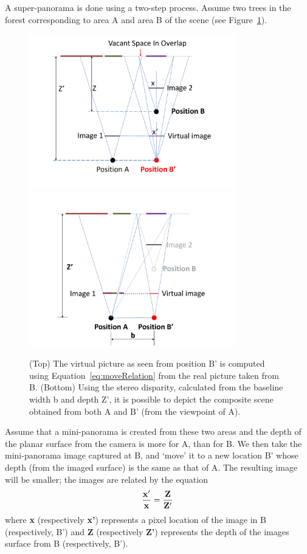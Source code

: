 A super-panorama is done using a two-step process. Assume two trees in
the forest corresponding to area A and area B of the scene (see
Figure~\ref{fig:stereo}). 
\begin{figure}[h!]
  \centering
  \includegraphics[width=0.8\textwidth]{figures/vacantSpaces/move} \\
  \includegraphics[width=0.8\textwidth]{figures/vacantSpaces/stereo} 
  \caption[Creation of Super-panoramas]{ \label{fig:stereo} (Top) The virtual
  picture as seen from position B' is computed using Equation~\ref{eq:moveRelation} from the real picture
    taken from B.  (Bottom) Using the stereo disparity, calculated from the baseline 
   width b and depth Z',  it is possible to depict the composite scene obtained from both A
  and B' (from the viewpoint of A).}
\end{figure}    
Assume that a mini-panorama is created from these two areas and the
depth of the planar surface from the camera is more for A, than for
B. We then take the mini-panorama image captured at B, and `move' it to
a new location B' whose depth (from the imaged surface) is the same as
that of A. The resulting image  will be smaller; the images are
related by the equation
\begin{equation}
  \label{eq:moveRelation}
  {\bf \frac{x'}{x} = \frac{Z}{Z'}}
\end{equation}
where {\bf x} (respectively {\bf x'}) represents a pixel location of
the image in B (respectively, B') and 
{\bf Z} (respectively {\bf Z'}) represents the depth of the images
surface from B (respectively, B').

